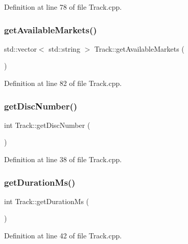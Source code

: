 Definition at line 78 of file Track.\+cpp.

\mbox{\label{class_track_abdbcd6cc1357e70a7a63f522e1a798f7}} 
\subsubsection{\texorpdfstring{get\+Available\+Markets()}{getAvailableMarkets()}}
{\footnotesize\ttfamily std\+::vector$<$ std\+::string $>$ Track\+::get\+Available\+Markets (\begin{DoxyParamCaption}{ }\end{DoxyParamCaption})}



Definition at line 82 of file Track.\+cpp.

\mbox{\label{class_track_a940f7a950d85559a2c221f90eaab4148}} 
\subsubsection{\texorpdfstring{get\+Disc\+Number()}{getDiscNumber()}}
{\footnotesize\ttfamily int Track\+::get\+Disc\+Number (\begin{DoxyParamCaption}{ }\end{DoxyParamCaption})}



Definition at line 38 of file Track.\+cpp.

\mbox{\label{class_track_a4a80edba869a19b85a47265fabe4d90c}} 
\subsubsection{\texorpdfstring{get\+Duration\+Ms()}{getDurationMs()}}
{\footnotesize\ttfamily int Track\+::get\+Duration\+Ms (\begin{DoxyParamCaption}{ }\end{DoxyParamCaption})}



Definition at line 42 of file Track.\+cpp.

